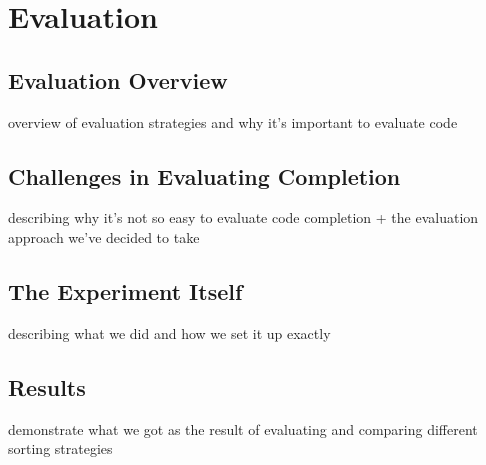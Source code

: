 \chapter{Evaluation}
\label{chap:Evaluation}

\section{Evaluation Overview}
overview of evaluation strategies and why it's important to evaluate code

\section{Challenges in Evaluating Completion}
describing why it's not so easy to evaluate code completion + the evaluation approach we've decided to take

\section{The Experiment Itself}
describing what we did and how we set it up exactly

\section{Results}
demonstrate what we got as the result of evaluating and comparing different sorting strategies